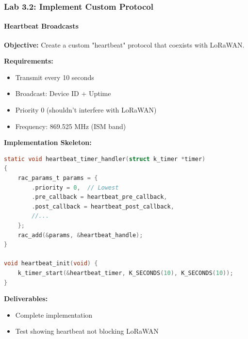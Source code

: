 \documentclass{beamer}
\begin{document}
\begin{frame}[fragile]
\frametitle{Lab 3.2: Implement Custom Protocol}
\framesubtitle{Heartbeat Broadcasts}

\textbf{Objective:} Create a custom "heartbeat" protocol that coexists with LoRaWAN.

\textbf{Requirements:}
\begin{itemize}
    \item Transmit every 10 seconds
    \item Broadcast: Device ID + Uptime
    \item Priority 0 (shouldn't interfere with LoRaWAN)
    \item Frequency: 869.525 MHz (ISM band)
\end{itemize}

\textbf{Implementation Skeleton:}
\begin{lstlisting}[language=C, basicstyle=\tiny\ttfamily]
static void heartbeat_timer_handler(struct k_timer *timer)
{
    rac_params_t params = {
        .priority = 0,  // Lowest
        .pre_callback = heartbeat_pre_callback,
        .post_callback = heartbeat_post_callback,
        //...
    };
    rac_add(&params, &heartbeat_handle);
}

void heartbeat_init(void) {
    k_timer_start(&heartbeat_timer, K_SECONDS(10), K_SECONDS(10));
}
\end{lstlisting}

\textbf{Deliverables:}
\begin{itemize}
    \item Complete implementation
    \item Test showing heartbeat not blocking LoRaWAN
\end{itemize}
\end{frame}
\end{document}
